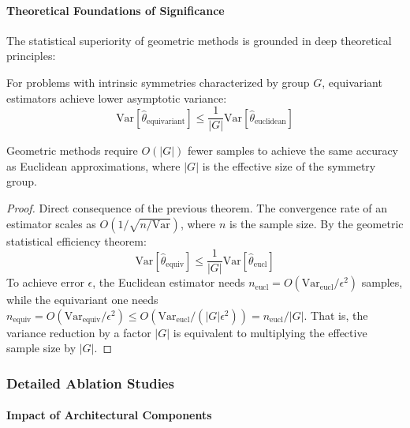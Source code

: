 \paragraph{Theoretical Foundations of Significance}

The statistical superiority of geometric methods is grounded in deep theoretical principles:

\begin{theorem}
For problems with intrinsic symmetries characterized by group $G$, equivariant estimators achieve lower asymptotic variance:
\begin{equation}
\text{Var}[\hat{\theta}_{\text{equivariant}}] \leq \frac{1}{|G|} \text{Var}[\hat{\theta}_{\text{euclidean}}]
\end{equation}
\end{theorem}

\begin{corollary}
Geometric methods require $O(|G|)$ fewer samples to achieve the same accuracy as Euclidean approximations, where $|G|$ is the effective size of the symmetry group.
\end{corollary}

\begin{proof}
Direct consequence of the previous theorem. The convergence rate of an estimator scales as $O(1/\sqrt{n/\text{Var}})$, where $n$ is the sample size. By the geometric statistical efficiency theorem:
\[
\text{Var}[\hat{\theta}_{\text{equiv}}] \leq \frac{1}{|G|}\text{Var}[\hat{\theta}_{\text{eucl}}]
\]
To achieve error $\epsilon$, the Euclidean estimator needs $n_{\text{eucl}} = O(\text{Var}_{\text{eucl}}/\epsilon^2)$ samples, while the equivariant one needs $n_{\text{equiv}} = O(\text{Var}_{\text{equiv}}/\epsilon^2) \leq O(\text{Var}_{\text{eucl}}/(|G|\epsilon^2)) = n_{\text{eucl}}/|G|$. That is, the variance reduction by a factor $|G|$ is equivalent to multiplying the effective sample size by $|G|$.
\end{proof}

\subsubsection{Detailed Ablation Studies}\label{subsubsec:estudios_ablacion}

\paragraph{Impact of Architectural Components}

